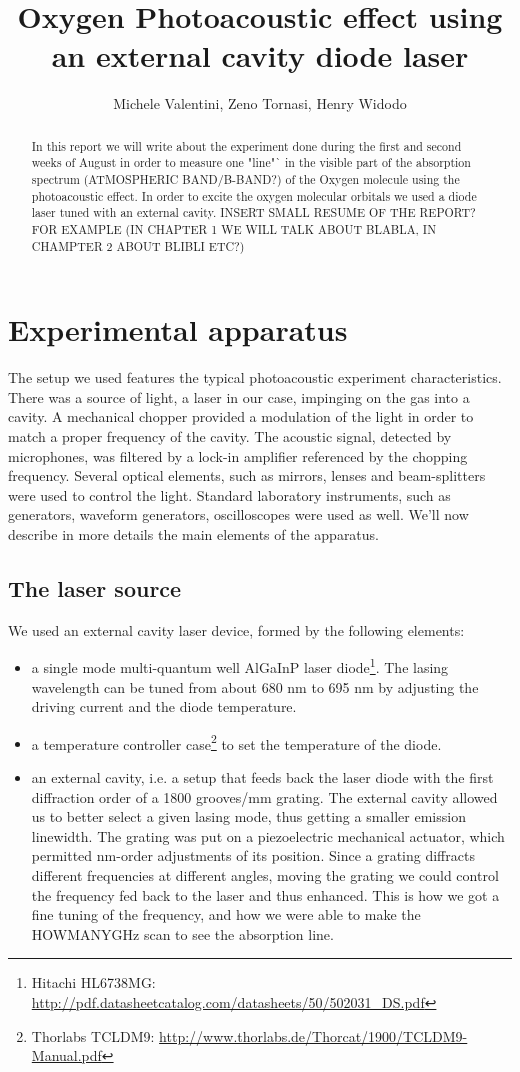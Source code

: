\documentclass[a4paper,11pt]{article}
\title{Oxygen Photoacoustic effect using an external cavity diode laser}
\author{Michele Valentini, Zeno Tornasi, Henry Widodo}
\begin{document}
\maketitle
\newpage

\begin{abstract}

In this report we will write about the experiment done during the first and second weeks of August in order to measure one "line"` in the visible part of the absorption spectrum (ATMOSPHERIC BAND/B-BAND?) of the Oxygen molecule using the photoacoustic effect. In order to excite the oxygen molecular orbitals we used a diode laser tuned with an external cavity. INSERT SMALL RESUME OF THE REPORT? FOR EXAMPLE (IN CHAPTER 1 WE WILL TALK ABOUT BLABLA, IN CHAMPTER 2 ABOUT BLIBLI ETC?)
\end{abstract}
\newpage
\section{Experimental apparatus}
The setup we used features the typical photoacoustic experiment characteristics. There was a source of light, a laser in our case, impinging on the gas into a cavity. A mechanical chopper provided a modulation of the light in order to match a proper frequency of the cavity. The acoustic signal, detected by microphones, was filtered by a lock-in amplifier referenced by the chopping frequency. Several optical elements, such as mirrors, lenses and beam-splitters were used to control the light. Standard laboratory instruments, such as generators, waveform generators, oscilloscopes were used as well. We'll now describe in more details the main elements of the apparatus.
\subsection{The laser source}
We used an external cavity laser device, formed by the following elements:
\begin{itemize}
\item a single mode multi-quantum well AlGaInP laser diode\footnote{Hitachi HL6738MG: \url{http://pdf.datasheetcatalog.com/datasheets/50/502031_DS.pdf}}.
 The lasing wavelength can be tuned from about 680 nm to 695 nm by adjusting the driving current and the diode temperature.
\item a temperature controller case\footnote{Thorlabs TCLDM9: \url{http://www.thorlabs.de/Thorcat/1900/TCLDM9-Manual.pdf}} to set the temperature of the diode. 
\item an external cavity, i.e. a setup that feeds back the laser diode with the first diffraction order of a 1800 grooves/mm grating. The external cavity allowed us to better select a given lasing mode, thus getting a smaller emission linewidth. The grating was put on a piezoelectric mechanical actuator, which permitted nm-order adjustments of its position. Since a grating diffracts different frequencies at different angles, moving the grating we could control the frequency fed back to the laser and thus enhanced. This is how we got a fine tuning of the frequency, and how we were able to make the HOWMANYGHz scan to see the absorption line. 
\end{itemize} 
\end{document}
